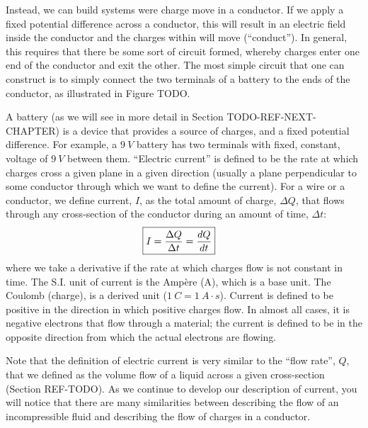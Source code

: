 Instead, we can build systems were charge move in a conductor. If we apply a fixed potential difference across a conductor, this will result in an electric field inside the conductor and the charges within will move (``conduct''). In general, this requires that there be some sort of circuit formed, whereby charges enter one end of the conductor and exit the other. The most simple circuit that one can construct is to simply connect the two terminals of a battery to the ends of the conductor, as illustrated in Figure TODO. 

A battery (as we will see in more detail in Section TODO-REF-NEXT-CHAPTER) is a device that provides a source of charges, and a fixed potential difference. For example, a $\SI{9}{V}$ battery has two terminals with fixed, constant, voltage of $\SI{9}{V}$ between them.
``Electric current'' is defined to be the rate at which charges cross a given plane in a given direction (usually a plane perpendicular to some conductor through which we want to define the current). For a wire or a conductor, we define current, $I$, as the total amount of charge, $\Delta Q$, that flows through any cross-section of the conductor during an amount of time, $\Delta t$:
\begin{align*}
\Aboxed{I=\frac{\Delta Q}{\Delta t}=\frac{dQ}{dt}}
\end{align*}
where we take a derivative if the rate at which charges flow is not constant in time. The S.I. unit of current is the Ampère (\si{A}), which is a base unit. The Coulomb (charge), is a derived unit ($\SI{1}{C}=\SI{1}{A\cdot s}$). Current is defined to be positive in the direction in which positive charges flow. In almost all cases, it is negative electrons that flow through a material; the current is defined to be in the opposite direction from which the actual electrons are flowing.

Note that the definition of electric current is very similar to the ``flow rate'', $Q$, that we defined as the volume flow of a liquid across a given cross-section (Section REF-TODO). As we continue to develop our description of current, you will notice that there are many similarities between describing the flow of an incompressible fluid and describing the flow of charges in a conductor.

